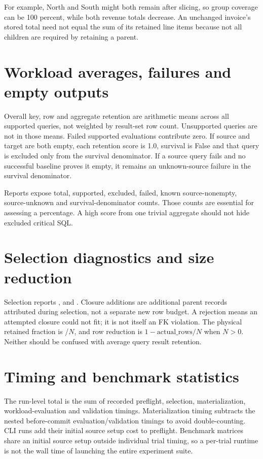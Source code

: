 \documentclass[11pt,a4paper,oneside]{report}
\begin{document}
For example, North and South might both remain after slicing, so group coverage can be 100 percent, while both revenue totals decrease. An unchanged invoice's stored total need not equal the sum of its retained line items because not all children are required by retaining a parent.

\section{Workload averages, failures and empty outputs}
Overall key, row and aggregate retention are arithmetic means across all supported queries, not weighted by result-set row count. Unsupported queries are not in those means. Failed supported evaluations contribute zero. If source and target are both empty, each retention score is 1.0, survival is False and that query is excluded only from the survival denominator. If a source query fails and no successful baseline proves it empty, it remains an unknown-source failure in the survival denominator.

Reports expose total, supported, excluded, failed, known source-nonempty, source-unknown and survival-denominator counts. Those counts are essential for assessing a percentage. A high score from one trivial aggregate should not hide excluded critical SQL.

\section{Selection diagnostics and size reduction}
Selection reports ,  and . Closure additions are additional parent records attributed during selection, not a separate new row budget. A rejection means an attempted closure could not fit; it is not itself an FK violation. The physical retained fraction is /$N$, and row reduction is $1-\text{actual\_rows}/N$ when $N>0$. Neither should be confused with average query result retention.

\section{Timing and benchmark statistics}
The run-level total is the sum of recorded preflight, selection, materialization, workload-evaluation and validation timings. Materialization timing subtracts the nested before-commit evaluation/validation timings to avoid double-counting. CLI runs add their initial source setup cost to preflight. Benchmark matrices share an initial source setup outside individual trial timing, so a per-trial runtime is not the wall time of launching the entire experiment suite.
\end{document}
